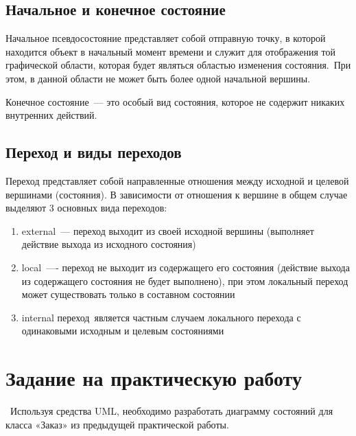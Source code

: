 \subsection{Начальное и конечное состояние}

Начальное псевдосостояние представляет собой отправную точку, в которой находится объект в начальный момент времени и служит для отображения той графической области, которая будет являться областью изменения состояния. При этом, в данной области не может быть более одной начальной вершины.

Конечное состояние --- это особый вид состояния, которое не содержит никаких внутренних действий. 

\subsection{Переход и виды переходов}

Переход представляет собой направленные отношения между исходной и целевой вершинами (состояния). В зависимости от отношения к вершине в общем случае выделяют 3 основных вида переходов:

\begin{enumerate}
	\item{ external --- переход выходит из своей исходной вершины (выполняет действие выхода из исходного состояния)}
	\item{local ---- переход не выходит из содержащего его состояния (действие выхода из содержащего состояния не будет выполнено), при этом локальный переход может существовать только в составном состоянии}
	\item{ internal переход является частным случаем локального перехода с одинаковыми исходным и целевым состояниями}
\end{enumerate}

\section{Задание на практическую работу}

 Используя средства UML, необходимо разработать диаграмму состояний для класса «Заказ» из предыдущей практической работы.
